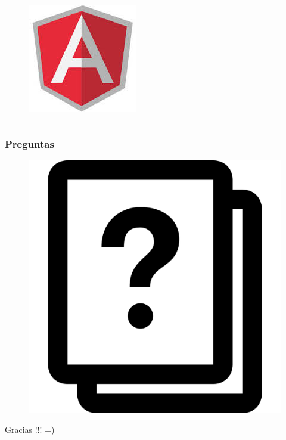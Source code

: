 \documentclass{beamer}
\begin{document}
\begin{frame}
\begin{columns}[c]
\begin{figure}
\includegraphics[width=0.8\linewidth]{angular.png}
\end{figure}
\end{columns}
\end{frame}

\begin{frame}
\frametitle{Preguntas}
\begin{figure}
\includegraphics[width=0.4\linewidth]{preguntas.png}
\end{figure}
\end{frame}

\begin{frame}
\Huge{\centerline{Gracias !!! =)}}
\end{frame}

\end{document}
